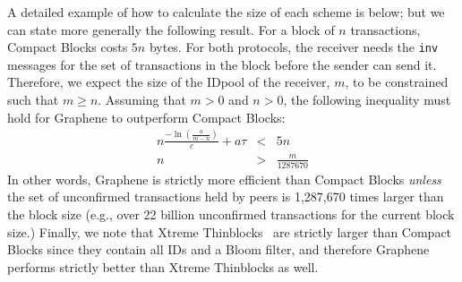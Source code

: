 A detailed example of how to calculate the size of each scheme is below; but we can state more generally the following result. For a
block of $n$ transactions, Compact Blocks costs $5n$ bytes. For both
protocols, the receiver needs the {\tt inv} messages for the set of
transactions in the block before the sender can send it. Therefore, we
expect the size of the IDpool of the receiver, $m$, to be constrained
such that $m \geq n$. Assuming that $m > 0$ and $n > 0$, the following
inequality must hold for Graphene to outperform Compact Blocks: 
\begin{eqnarray}
n\frac{-\ln(\frac{a}{m-n})}{c}+ a\tau &<& 5n\\
n&>& \frac{m}{1287670}
\end{eqnarray}
%
In other words, Graphene is strictly more efficient than Compact Blocks {\em unless} the  set of unconfirmed transactions held by peers  is 1,287,670 times larger than the block size (e.g.,  over 22 billion unconfirmed transactions for the current block size.)  Finally, we note that Xtreme Thinblocks~\cite{Tschipper:2016} are  strictly larger than Compact Blocks since they contain all IDs and a Bloom filter, and therefore Graphene performs strictly better than Xtreme Thinblocks as well. 

